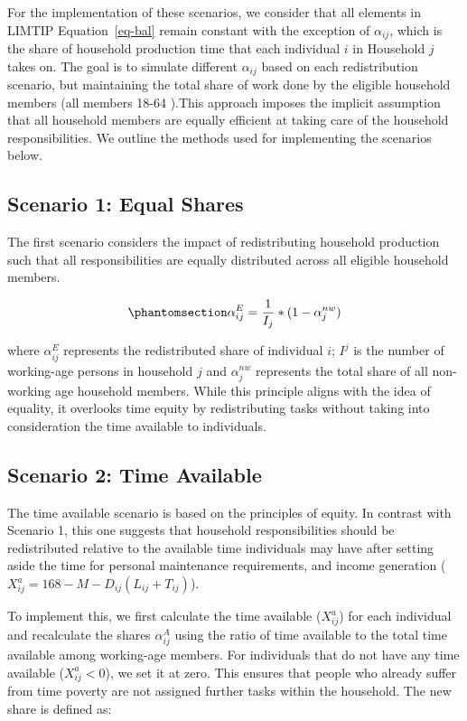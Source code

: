 \documentclass[
  11pt,
]{article}
\begin{document}
For the implementation of these scenarios, we consider that all elements
in LIMTIP Equation~\ref{eq-bal} remain constant with the exception of
\(\alpha_{ij}\), which is the share of household production time that
each individual \(i\) in Household \(j\) takes on. The goal is to
simulate different \(\alpha_{ij}\) based on each redistribution
scenario, but maintaining the total share of work done by the eligible
household members (all members 18-64 ).This approach imposes the
implicit assumption that all household members are equally efficient at
taking care of the household responsibilities. We outline the methods
used for implementing the scenarios below.

\subsection{Scenario 1: Equal Shares}\label{scenario-1-equal-shares}

The first scenario considers the impact of redistributing household
production such that all responsibilities are equally distributed across
all eligible household members.

\begin{equation}\phantomsection\label{eq-r1}{\alpha_{ij}^E= \frac{1}{I_j}*(1-\alpha_{j}^{nw})
}\end{equation}

where \(\alpha_{ij}^E\) represents the redistributed share of individual
\(i\); \(I^j\) is the number of working-age persons in household \(j\)
and \(\alpha_{j}^{nw}\) represents the total share of all non-working
age household members. While this principle aligns with the idea of
equality, it overlooks time equity by redistributing tasks without
taking into consideration the time available to individuals.

\subsection{Scenario 2: Time Available}\label{scenario-2-time-available}

The time available scenario is based on the principles of equity. In
contrast with Scenario 1, this one suggests that household
responsibilities should be redistributed relative to the available time
individuals may have after setting aside the time for personal
maintenance requirements, and income generation
(\(X^a_{ij}=168-M-D_{ij}(L_{ij}+T_{ij})\)).

To implement this, we first calculate the time available (\(X^a_{ij}\))
for each individual and recalculate the shares \(\alpha_{ij}^A\) using
the ratio of time available to the total time available among
working-age members. For individuals that do not have any time available
(\(X^a_{ij}<0\)), we set it at zero. This ensures that people who
already suffer from time poverty are not assigned further tasks within
the household. The new share is defined as:
\end{document}
